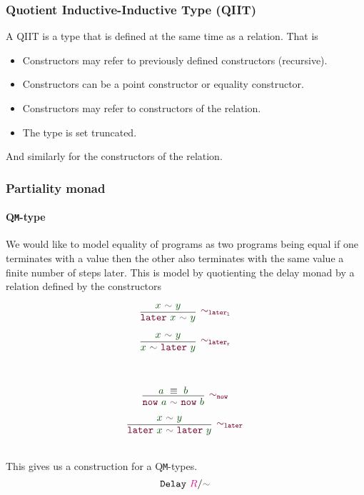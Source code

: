 \documentclass[xelatex,mathserif,serif,notheorems]{beamer} %
\theoremstyle{plain} %
\theoremstyle{definition}
\theoremstyle{remark}
\newcommand*{\term}[1]{\textcolor{green!30!black}{#1}} %
\newcommand*{\type}[1]{\textcolor{magenta!90!black}{#1}}
\newcommand*{\relation}[1]{\textcolor{gray!75!black}{\ensuremath{\mathtt{#1}}}}
\newcommand*{\constructor}[1]{\textcolor{purple!60!black}{\ensuremath{\mathtt{#1}}}}
\newcommand*{\typeformer}[1]{\ensuremath{\mathtt{#1}}}
\begin{document}
\begin{frame}
  \frametitle{Quotient Inductive-Inductive Type (QIIT)}
  A QIIT is a type that is defined at the same time as a relation. That is
  \begin{itemize}
  \item Constructors may refer to previously defined constructors (recursive).
  \item Constructors can be a point constructor or equality constructor.
  \item Constructors may refer to constructors of the relation.
  \item The type is set truncated.
  \end{itemize}
  And similarly for the constructors of the relation.
\end{frame}

\begin{frame}
  \frametitle{Partiality monad}
  \framesubtitle{Q\texttt{M}-type}
  We would like to model equality of programs as two programs being equal if one terminates with a value then the other also terminates with the same value a finite number of steps later. This is model by quotienting the delay monad by a relation defined by the constructors
  \strut
  \hfill
  \begin{minipage}{0.4\linewidth}
    \begin{equation}
      \vcenter{\infer[{\constructor{\sim_{later_l}}}]{\constructor{later}~\term{x}~\relation{\sim}~\term{y}}{\term{x}~\relation{\sim}~\term{y}}}
    \end{equation}
  \end{minipage}
  \hfill
    \begin{minipage}{0.4\linewidth}
    \begin{equation}
      \vcenter{\infer[{\constructor{\sim_{later_r}}}]{\term{x}~\relation{\sim}~\constructor{later}~\term{y}}{\term{x}~\relation{\sim}~\term{y}}}
    \end{equation}
  \end{minipage}
  \hfill
  \strut
  \\
  \strut
  \hfill
  \begin{minipage}{0.4\linewidth}
    \begin{equation}
      \vcenter{\infer[{\constructor{\sim_{now}}}]{\constructor{now}~\term{a}~\relation{\sim}~\constructor{now}~\term{b}}{\term{a}~\equiv~\term{b}}}
    \end{equation}
  \end{minipage}
  \hfill
  \begin{minipage}{0.5\linewidth}
    \begin{equation}
      \vcenter{\infer[{\constructor{\sim_{later}}}]{\constructor{later}~\term{x}~\relation{\sim}~\constructor{later}~\term{y}}{\term{x}~\relation{\sim}~\term{y}}}
    \end{equation}
  \end{minipage}
  \hfill
  \strut
  \\[5mm]
  This gives us a construction for a Q\texttt{M}-types.
  \begin{equation}
    \typeformer{Delay}~\type{R}/\relation{\sim}
  \end{equation}
\end{frame}
\end{document}
